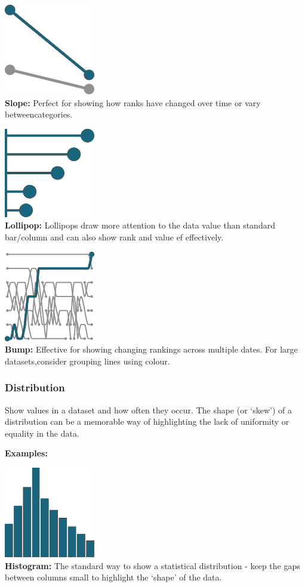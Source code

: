 \documentclass[
  a4paper,
  onecolumn,
  oneside]{book}
\begin{document}
\includegraphics{part1/images/ranking4.png}\\
\textbf{Slope:} Perfect for showing how ranks have changed over time or
vary betweencategories.

\includegraphics{part1/images/ranking5.png}\\
\textbf{Lollipop:} Lollipops draw more attention to the data value than
standard bar/column and can also show rank and value ef effectively.

\includegraphics{part1/images/ranking6.png}\\
\textbf{Bump:} Effective for showing changing rankings across multiple
dates. For large datasets,consider grouping lines using colour.

\hypertarget{distribution}{%
\subsubsection{Distribution}\label{distribution}}

Show values in a dataset and how often they occur. The shape (or `skew')
of a distribution can be a memorable way of highlighting the lack of
uniformity or equality in the data.

\textbf{Examples:}

\includegraphics{part1/images/distribution1.png}\\
\textbf{Histogram:} The standard way to show a statistical distribution
- keep the gaps between columns small to highlight the `shape' of the
data.
\end{document}
